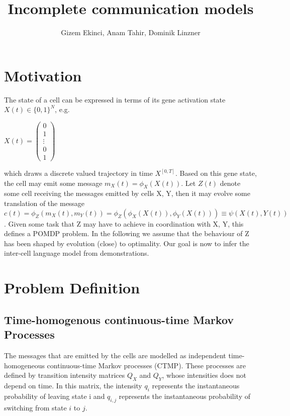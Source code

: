 \documentclass[]{article}
\title{Incomplete communication models}
\author{Gizem Ekinci, Anam Tahir, Dominik Linzner}
\begin{document}
	
	\maketitle
	
	\section{Motivation}
	
	The state of a cell can be expressed in terms of its gene activation state $ X(t) \in \{0, 1\}^{N} $, e.g.
	\begin{center}
		\begin{math}
		X(t)=\left(\begin{array}{c}
		{0} \\
		{1} \\
		{\vdots} \\
		{0} \\
		{1}
		\end{array}\right)
		\end{math}\\
	\end{center}
	which draws a discrete valued trajectory in time $ X^{[0,T]} $. Based on this gene state, the cell may emit some message $ m_{X}(t) = \phi_{X}(X(t)) $. Let $ Z(t) $ denote some cell receiving the messages emitted by cells X, Y, then it may evolve some translation of the message $ c(t) = \phi _{Z} (m_{X}(t),m_{Y}(t)) = \phi_{Z}(\phi_{X}(X(t)), \phi_{Y}(X(t))) \equiv \psi(X(t), Y(t)) $. Given some task that Z may have to achieve in coordination with X, Y, this defines a POMDP problem. In the following we assume that the behaviour of Z has been shaped by evolution (close) to optimality. Our goal is now to infer the inter-cell language model from demonstrations. \\
	
	\section{Problem Definition}
	
	\subsection{Time-homogenous continuous-time Markov Processes}
	The messages that are emitted by the cells are modelled as independent time-homogeneous continuous-time Markov processes (CTMP). These processes are defined by transition intensity matrices $ Q_{X} $ and $ Q_{Y} $, whose intensities does not depend on time. In this matrix, the intensity $ q_{i} $ represents the instantaneous probability of leaving state i and $ q_{i,j} $ represents the instantaneous probability of switching from state $ i $ to $ j $.\\
	
\end{document}
